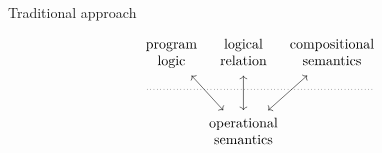 \documentclass[aspectratio=1610,mathserif]{beamer}
\begin{document}
\begin{frame}[fragile]{Traditional approach}
  \[
    \begin{tikzcd}[column sep=-1em, row sep=small]
      &
      \begin{array}{c} \text{program} \\ \text{logic} \end{array}
      \ar[ddr, leftrightarrow] &
      \begin{array}{c} \text{logical} \\ \text{relation} \end{array}
      \ar[dd, leftrightarrow] &
      \begin{array}{c} \text{compositional} \\ \text{semantics} \end{array}
      \ar[ddl, leftrightarrow]
      \\
      {} \ar[rrrr, dotted, dash] &&&& {}
      \\
      & &
      \begin{array}{c} \text{operational} \\ \text{semantics} \end{array}
    \end{tikzcd}
  \]
\end{frame}
\end{document}

